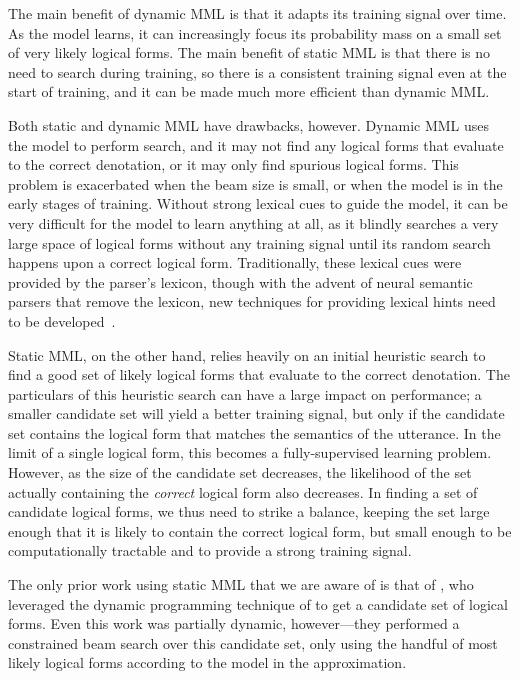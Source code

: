 The main benefit of dynamic MML is that it adapts its training signal over time.  As the model learns, it can increasingly focus its probability mass on a small set of very likely logical forms.  The main benefit of static MML is that there is no need to search during training, so there is a consistent training signal even at the start of training, and it can be made much more efficient than dynamic MML.

Both static and dynamic MML have drawbacks, however.  Dynamic MML uses the model to perform search, and it may not find any logical forms that evaluate to the correct denotation, or it may only find spurious logical forms.  This problem is exacerbated when the beam size is small, or when the model is in the early stages of training.  Without strong lexical cues to guide the model, it can be very difficult for the model to learn anything at all, as it blindly searches a very large space of logical forms without any training signal until its random search happens upon a correct logical form.  Traditionally, these lexical cues were provided by the parser's lexicon, though with the advent of neural semantic parsers that remove the lexicon, new techniques for providing lexical hints need to be developed~\cite{goldman2017weakly}.

Static MML, on the other hand, relies heavily on an initial heuristic search to find a good set of likely logical forms that evaluate to the correct denotation.  The particulars of this heuristic search can have a large impact on performance; a smaller candidate set will yield a better training signal, but only if the candidate set contains the logical form that matches the semantics of the utterance.  In the limit of a single logical form, this becomes a fully-supervised learning problem.  However, as the size of the candidate set decreases, the likelihood of the set actually containing the \emph{correct} logical form also decreases.  In finding a set of candidate logical forms, we thus need to strike a balance, keeping the set large enough that it is likely to contain the correct logical form, but small enough to be computationally tractable and to provide a strong training signal.

The only prior work using static MML that we are aware of is that of \citet{krishnamurthy2017neural}, who leveraged the dynamic programming technique of \citet{pasupat2016inferring} to get a candidate set of logical forms.  Even this work was partially dynamic, however---they performed a constrained beam search over this candidate set, only using the handful of most likely logical forms according to the model in the approximation.

